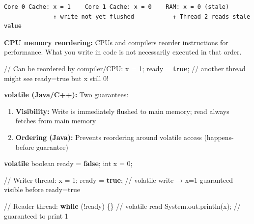 \documentclass[11pt]{article}
\providecommand{\tightlist}{\setlength{\itemsep}{1pt}\setlength{\parskip}{0pt}}
\newenvironment{Shaded}{\begin{snugshade}}{\end{snugshade}}
\newcommand{\BuiltInTok}[1]{\textcolor[rgb]{0.50,0.55,0.55}{#1}}
\newcommand{\CommentTok}[1]{\textcolor[rgb]{0.48,0.49,0.49}{#1}}
\newcommand{\ControlFlowTok}[1]{\textcolor[rgb]{0.99,0.74,0.29}{\textbf{#1}}}
\newcommand{\DataTypeTok}[1]{\textcolor[rgb]{0.16,0.50,0.73}{#1}}
\newcommand{\DecValTok}[1]{\textcolor[rgb]{0.96,0.45,0.00}{#1}}
\newcommand{\FunctionTok}[1]{\textcolor[rgb]{0.56,0.27,0.68}{#1}}
\newcommand{\KeywordTok}[1]{\textcolor[rgb]{0.81,0.81,0.76}{\textbf{#1}}}
\newcommand{\NormalTok}[1]{\textcolor[rgb]{0.81,0.81,0.76}{#1}}
\newcommand{\OperatorTok}[1]{\textcolor[rgb]{0.81,0.81,0.76}{#1}}
\begin{document}
\setcodelang{}

\begin{verbatim}
Core 0 Cache: x = 1    Core 1 Cache: x = 0    RAM: x = 0 (stale)
              ↑ write not yet flushed           ↑ Thread 2 reads stale value
\end{verbatim}

\textbf{CPU memory reordering:} CPUs and compilers reorder instructions for performance. What you write in code is not necessarily executed in that order.


\begin{Shaded}
\begin{Highlighting}[]
\CommentTok{// Can be reordered by compiler/CPU:}
\NormalTok{x }\OperatorTok{=} \DecValTok{1}\OperatorTok{;}
\NormalTok{ready }\OperatorTok{=} \KeywordTok{true}\OperatorTok{;}  \CommentTok{// another thread might see ready=true but x still 0!}
\end{Highlighting}
\end{Shaded}

\textbf{volatile (Java/C++):} Two guarantees:

\begin{enumerate}
\def\labelenumi{\arabic{enumi}.}
\tightlist
\item
  \textbf{Visibility:} Write is immediately flushed to main memory; read always fetches from main memory
\item
  \textbf{Ordering (Java):} Prevents reordering around volatile access (happens-before guarantee)
\end{enumerate}


\begin{Shaded}
\begin{Highlighting}[]
\KeywordTok{volatile} \DataTypeTok{boolean}\NormalTok{ ready }\OperatorTok{=} \KeywordTok{false}\OperatorTok{;}
\DataTypeTok{int}\NormalTok{ x }\OperatorTok{=} \DecValTok{0}\OperatorTok{;}

\CommentTok{// Writer thread:}
\NormalTok{x }\OperatorTok{=} \DecValTok{1}\OperatorTok{;}
\NormalTok{ready }\OperatorTok{=} \KeywordTok{true}\OperatorTok{;}  \CommentTok{// volatile write → x=1 guaranteed visible before ready=true}

\CommentTok{// Reader thread:}
\ControlFlowTok{while} \OperatorTok{(!}\NormalTok{ready}\OperatorTok{)} \OperatorTok{\{\}}  \CommentTok{// volatile read}
\BuiltInTok{System}\OperatorTok{.}\FunctionTok{out}\OperatorTok{.}\FunctionTok{println}\OperatorTok{(}\NormalTok{x}\OperatorTok{);}  \CommentTok{// guaranteed to print 1}
\end{Highlighting}
\end{Shaded}
\end{document}
